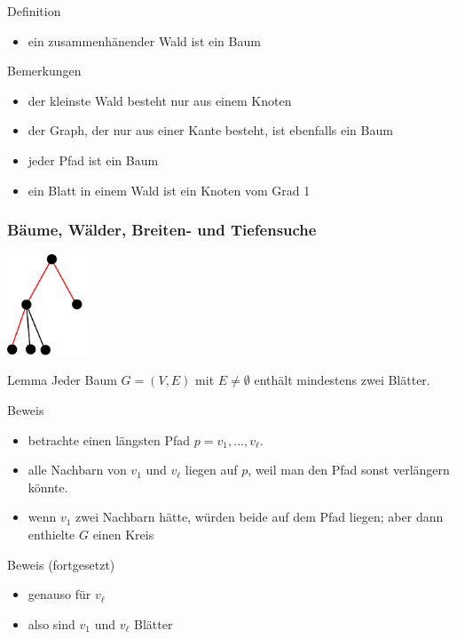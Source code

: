 \documentclass[aspectratio=1610, 11pt]{beamer}
\newcommand{\mytitle}{B\"aume, W\"alder, Breiten- und Tiefensuche}
\begin{document}
\begin{frame}
\begin{overprint}
\begin{block}{Definition}
\begin{itemize}
				\item ein zusammenh\"anender Wald ist ein \alert{Baum}
			\end{itemize}
		\end{block}
		\begin{exampleblock}{Bemerkungen}
			\begin{itemize}
				\item der kleinste Wald besteht nur aus einem Knoten	
				\item der Graph, der nur aus einer Kante besteht, ist ebenfalls ein Baum
				\item jeder Pfad ist ein Baum
				\item ein \alert{Blatt} in einem Wald ist ein Knoten vom Grad 1
			\end{itemize}
		\end{exampleblock}
	\end{overprint}
\end{frame}

\begin{frame}\frametitle{\mytitle}
		\hfill\includegraphics[height=30mm]{images/tree2.pdf}
	\begin{overprint}
		\begin{block}{Lemma}
			Jeder Baum $G=(V,E)$ mit $E\neq\emptyset$ enth\"alt mindestens zwei Bl\"atter.
		\end{block}
		\begin{exampleblock}{Beweis}
			\begin{itemize}
				\item betrachte einen l\"angsten Pfad $p=v_1,\ldots,v_\ell$.
				\item alle Nachbarn von $v_1$ und $v_\ell$ liegen auf $p$, weil man den Pfad sonst verl\"angern k\"onnte.
				\item wenn $v_1$ zwei Nachbarn h\"atte, w\"urden beide auf dem Pfad liegen; aber dann enthielte $G$ einen Kreis
			\end{itemize}
		\end{exampleblock}
		\begin{exampleblock}{Beweis (fortgesetzt)}
			\begin{itemize}
				\item genauso f\"ur $v_\ell$
				\item also sind $v_1$ und $v_\ell$ Bl\"atter
			\end{itemize}
		\end{exampleblock}
	\end{overprint}
\end{frame}
\end{document}

